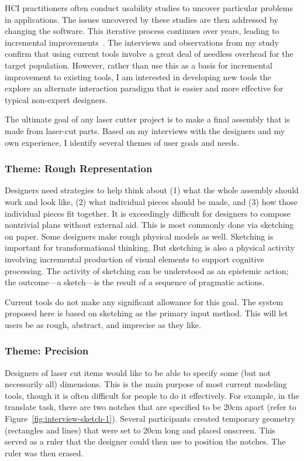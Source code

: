 \documentclass[11pt]{article}
\begin{document}
HCI practitioners often conduct usability studies to uncover
particular problems in applications. The issues uncovered by these
studies are then addressed by changing the software. This iterative
process continues over years, leading to incremental
improvements~\cite{buxton-sketching}. The interviews and observations
from my study confirm that using current tools involve a great deal of
needless overhead for the target population. However, rather than use
this as a basis for incremental improvement to existing tools, I am
interested in developing new tools the explore an alternate
interaction paradigm that is easier and more effective for typical
non-expert designers.

The ultimate goal of any laser cutter project is to make a final
assembly that is made from laser-cut parts. Based on my interviews
with the designers and my own experience, I identify several themes of
user goals and needs.

\subsubsection{Theme: Rough Representation} 

Designers need strategies to help think about (1) what the whole
assembly should work and look like, (2) what individual pieces should
be made, and (3) how those individual pieces fit together. It is
exceedingly difficult for designers to compose nontrivial plans
without external aid. This is most commonly done via sketching on
paper. Some designers make rough physical models as well. Sketching is
important for transformational thinking. But sketching is also a
physical activity involving incremental production of visual elements
to support cognitive processing. The activity of sketching can be
understood as an epistemic action; the outcome---a sketch---is the
result of a sequence of pragmatic actions.

Current tools do not make any significant allowance for this goal. The
system proposed here is based on sketching as the primary input
method. This will let users be as rough, abstract, and imprecise as
they like.

\subsubsection{Theme: Precision}

Designers of laser cut items would like to be able to specify some
(but not necessarily all) dimensions. This is the main purpose of most
current modeling tools, though it is often difficult for people to do
it effectively. For example, in the translate task, there are two
notches that are specified to be 20cm apart (refer to
Figure~\ref{fig:interview-sketch-1}). Several participants created
temporary geometry (rectangles and lines) that were set to 20cm long
and placed onscreen. This served as a ruler that the designer could
then use to position the notches. The ruler was then erased.
\end{document}
